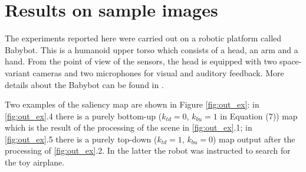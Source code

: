 \documentclass{llncs}
\begin{document}
\section{Results on sample images}
\label{sec:att_results}
The experiments reported here were carried out
on a robotic platform called Babybot. This is a
humanoid upper torso which consists of a head, an arm
and a hand. 
From the point of view of the sensors, the head is
equipped with two space-variant cameras \cite{SandiniQSM00}
and two microphones for visual and auditory feedback.
More details about the Babybot can be found in \cite{Natale04}.

Two examples of the saliency map are shown in
Figure \ref{fig:out_ex}: in \ref{fig:out_ex}.4 there is a purely bottom-up ($k_{td}=0$,
$k_{bu}=1$ in Equation (7)) map which is the result of the
processing of the scene in \ref{fig:out_ex}.1; in \ref{fig:out_ex}.5 there is a purely
top-down ($k_{td}=1$, $k_{bu}=0$) map output after the
processing of \ref{fig:out_ex}.2. In the latter the robot was instructed
to search for the toy airplane.


\end{document}
